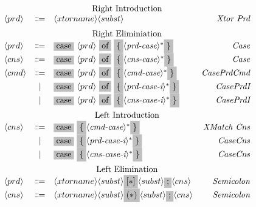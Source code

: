 \documentclass[11pt]{article}
\newcommand{\nonterminal}[1]{\langle #1 \rangle}
\newcommand{\terminal}[1]{\colorbox{lightgray}{#1}}
\begin{document}
\[
  \begin{array}{lclr}
    \multicolumn{4}{c}{\text{Right Introduction}} \\
    \nonterminal{prd} & \Coloneqq & \nonterminal{xtorname}\nonterminal{subst} & \emph{Xtor Prd} \\[0.2cm]
    \multicolumn{4}{c}{\text{Right Eliminiation}} \\
    \nonterminal{prd} & \Coloneqq & \terminal{case}\ \nonterminal{prd}\ \terminal{of}\ \terminal{\{} \nonterminal{\textit{prd-case}}^{\ast} \terminal{\}} & \emph{Case} \\
    \nonterminal{cns} & \Coloneqq & \terminal{case}\ \nonterminal{prd}\ \terminal{of}\ \terminal{\{} \nonterminal{\textit{cns-case}}^{\ast} \terminal{\}} & \emph{Case} \\
    \nonterminal{cmd} & \Coloneqq & \terminal{case}\ \nonterminal{prd}\ \terminal{of}\ \terminal{\{} \nonterminal{\textit{cmd-case}}^{\ast} \terminal{\}} & \emph{CasePrdCmd} \\
    & | & \terminal{case}\ \nonterminal{prd}\ \terminal{of}\ \terminal{\{} \nonterminal{\textit{prd-case-i}}^{\ast} \terminal{\}} & \emph{CasePrdI} \\
    & | & \terminal{case}\ \nonterminal{prd}\ \terminal{of}\ \terminal{\{} \nonterminal{\textit{cns-case-i}}^{\ast} \terminal{\}} & \emph{CasePrdI} \\[0.2cm]
    \multicolumn{4}{c}{\text{Left Introduction}} \\
    \nonterminal{cns} & \Coloneqq & \terminal{case}\ \terminal{\{} \nonterminal{\textit{cmd-case}}^{\ast} \terminal{\}} & \emph{XMatch Cns} \\
    & | & \terminal{case}\ \terminal{\{} \nonterminal{\textit{prd-case-i}}^{\ast} \terminal{\}} & \emph{CaseCns} \\
    & | & \terminal{case}\ \terminal{\{} \nonterminal{\textit{cns-case-i}}^{\ast} \terminal{\}} & \emph{CaseCns} \\[0.2cm]
    \multicolumn{4}{c}{\text{Left Elimination}} \\
    \nonterminal{prd} & \Coloneqq & \nonterminal{xtorname}\nonterminal{subst}\terminal{$[\ast]$}\nonterminal{subst}\terminal{;}\nonterminal{cns} & \emph{Semicolon} \\
    \nonterminal{cns} & \Coloneqq & \nonterminal{xtorname}\nonterminal{subst}\terminal{$(\ast)$}\nonterminal{subst}\terminal{;}\nonterminal{cns} & \emph{Semicolon} \\
  \end{array}
\]
\end{document}
